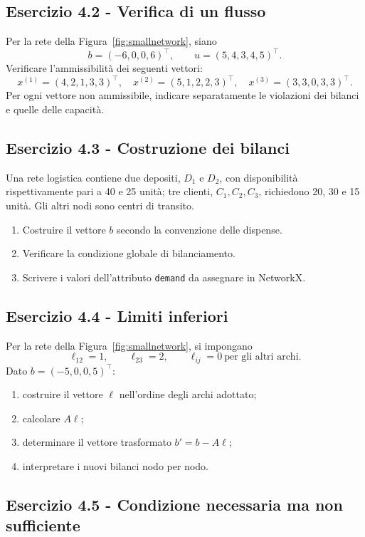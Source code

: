 \documentclass[11pt,a4paper]{article}
\begin{document}
\subsection*{Esercizio 4.2 - Verifica di un flusso}

Per la rete della Figura~\ref{fig:smallnetwork}, siano
\[
b=(-6,0,0,6)^\top,\qquad
u=(5,4,3,4,5)^\top.
\]
Verificare l'ammissibilità dei seguenti vettori:
\[
x^{(1)}=(4,2,1,3,3)^\top,
\quad
x^{(2)}=(5,1,2,2,3)^\top,
\quad
x^{(3)}=(3,3,0,3,3)^\top.
\]
Per ogni vettore non ammissibile, indicare separatamente le violazioni dei bilanci e quelle delle capacità.

\subsection*{Esercizio 4.3 - Costruzione dei bilanci}

Una rete logistica contiene due depositi, $D_1$ e $D_2$, con disponibilità rispettivamente pari a 40 e 25 unità; tre clienti, $C_1,C_2,C_3$, richiedono 20, 30 e 15 unità. Gli altri nodi sono centri di transito.
\begin{enumerate}[label=(\alph*)]
  \item Costruire il vettore $b$ secondo la convenzione delle dispense.
  \item Verificare la condizione globale di bilanciamento.
  \item Scrivere i valori dell'attributo \texttt{demand} da assegnare in NetworkX.
\end{enumerate}

\subsection*{Esercizio 4.4 - Limiti inferiori}

Per la rete della Figura~\ref{fig:smallnetwork}, si impongano
\[
\ell_{12}=1,\qquad \ell_{23}=2,\qquad \ell_{ij}=0\ \text{per gli altri archi}.
\]
Dato $b=(-5,0,0,5)^\top$:
\begin{enumerate}[label=(\alph*)]
  \item costruire il vettore $\ell$ nell'ordine degli archi adottato;
  \item calcolare $A\ell$;
  \item determinare il vettore trasformato $b'=b-A\ell$;
  \item interpretare i nuovi bilanci nodo per nodo.
\end{enumerate}

\subsection*{Esercizio 4.5 - Condizione necessaria ma non sufficiente}
\end{document}
